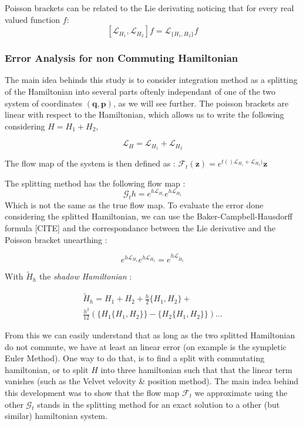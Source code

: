 \documentclass[ansiapaper]{report}
\begin{document}
\begin{multicols}{3}
	Poisson brackets can be related to the Lie derivating noticing that for every real valued function $f$: $$[\mathcal{L}_{H_1}, \mathcal{L}_{H_2}]f = \mathcal{L}_{\{H_1, H_2\}}f$$

	\subsubsection{Error Analysis for non Commuting Hamiltonian}
	The main idea behinds this study is to consider integration method as a splitting of the Hamiltonian into several parts oftenly independant of one of the two system of coordinates $(\textbf{q}, \textbf{p})$, as we will see further. The poisson brackets are linear with respect to the Hamiltonian, which allows us to write the following considering $H = H_1 + H_2$,

	$$\mathcal{L}_H = \mathcal{L}_{H_1} + \mathcal{L}_{H_2}$$

	The flow map of the system is then defined as : $\mathcal{F}_t(\textbf{z}) = e^{t()\mathcal{L}_{H_1} + \mathcal{L}_{H_2})}\textbf{z}  $

	The splitting method has the following flow map : $$\mathcal{G}_th= e^{h\mathcal{L}_{H_1}}e^{h\mathcal{L}_{H_2}}$$ Which is not the same as the true flow map. To evaluate the error done considering the splitted Hamiltonian, we can use the Baker-Campbell-Hausdorff formula [CITE] and the correspondance between the Lie derivative and the Poisson bracket unearthing :

	$$ e^{h\mathcal{L}_{H_1}}e^{h\mathcal{L}_{H_2}} = e^{ h \mathcal{L}_{\tilde{H}_h}}$$

	With $\tilde{H}_h$ the \textit{shadow Hamiltonian} :

	\begin{multline*}
		\tilde{H}_h = H_1 + H_2 + \frac{h}{2}\{H_1 , H_2 \} + \\
		\frac{h^2}{12}(\{H_1 \{H_1 , H_2\} \} - \{H_2 \{H_1 , H_2 \} \}) \dots
	\end{multline*}


	From this we can easily understand that as long as the two splitted Hamiltonian do not commute, we have at least an linear error (on example is the sympletic Euler Method). One way to do that, is to find a split with commutating hamiltonian, or to split $H$ into three hamiltonian such that that the linear term vanishes (such as the Velvet velovity \& position method). The main indea behind this  development was to show that the flow map $\mathcal{F}_t$ we approximate using the other $\mathcal{G}_t$ stands in the splitting method for an exact solution to a other (but similar) hamiltonian system.


\end{multicols}
\end{document}
